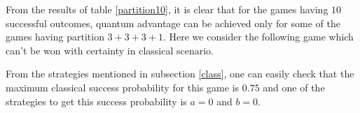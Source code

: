 \documentclass[]{svjour3}
\begin{document}

From the results of table \ref{partition10}, it is clear that for the games having $10$ successful outcomes, quantum advantage can be achieved only for some of the games having partition $3+3+3+1$.
Here we consider the following game which can't be won with certainty in classical scenario.

\begin{table}[htb]
	\begin{center}
		\setlength{\tabcolsep}{0.35em}
	\end{center}
\end{table}


From the strategies mentioned in subsection \ref{class}, one can easily check that the maximum classical success probability for this game is $0.75$ and one of the strategies to get this success probability is $a=0$ and $b=0$.
\end{document}
